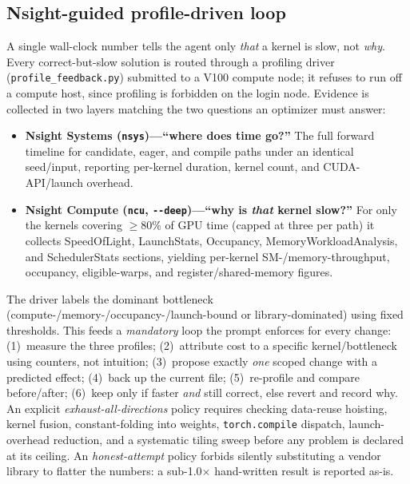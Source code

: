 \documentclass[conference]{IEEEtran}
\begin{document}
\subsection{Nsight-guided profile-driven loop}
A single wall-clock number tells the agent only \emph{that} a kernel is slow,
not \emph{why}. Every correct-but-slow solution is routed through a profiling
driver (\texttt{profile\_feedback.py}) submitted to a V100 compute node; it
refuses to run off a compute host, since profiling is forbidden on the login
node. Evidence is collected in two layers matching the two questions an
optimizer must answer:
\begin{itemize}
  \item \textbf{Nsight Systems (\texttt{nsys})---``where does time go?''}
  The full forward timeline for candidate, eager, and compile paths under an
  identical seed/input, reporting per-kernel duration, kernel count, and
  CUDA-API/launch overhead.
  \item \textbf{Nsight Compute (\texttt{ncu}, \texttt{-{}-deep})---``why is
  \emph{that} kernel slow?''} For only the kernels covering $\ge$80\% of GPU
  time (capped at three per path) it collects SpeedOfLight, LaunchStats,
  Occupancy, MemoryWorkloadAnalysis, and SchedulerStats sections, yielding
  per-kernel SM-/memory-throughput, occupancy, eligible-warps, and
  register/shared-memory figures.
\end{itemize}
The driver labels the dominant bottleneck (compute-/memory-/occupancy-/launch-bound
or library-dominated) using fixed thresholds. This feeds a \emph{mandatory}
loop the prompt enforces for every change: (1)~measure the three profiles;
(2)~attribute cost to a specific kernel/bottleneck using counters, not
intuition; (3)~propose exactly \emph{one} scoped change with a predicted effect;
(4)~back up the current file; (5)~re-profile and compare before/after;
(6)~keep only if faster \emph{and} still correct, else revert and record why.
An explicit \emph{exhaust-all-directions} policy requires checking data-reuse
hoisting, kernel fusion, constant-folding into weights, \texttt{torch.compile}
dispatch, launch-overhead reduction, and a systematic tiling sweep before any
problem is declared at its ceiling. An \emph{honest-attempt} policy forbids
silently substituting a vendor library to flatter the numbers: a sub-1.0$\times$
hand-written result is reported as-is.

\end{document}
